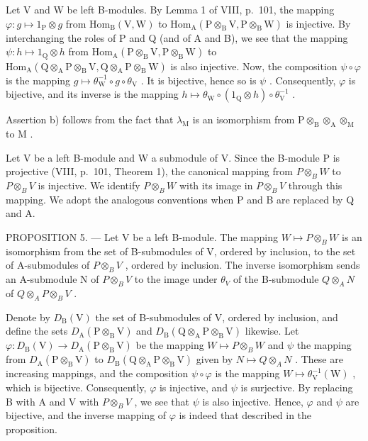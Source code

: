 Let V and W be left B-modules. By Lemma 1 of VIII, p.~101, the mapping \(\varphi : g \mapsto 1_{\mathrm{P}} \otimes g\) from \(\mathrm{Hom}_{\mathrm{B}}(\mathrm{V}, \mathrm{W})\) to \(\mathrm{Hom}_{\mathrm{A}}(\mathrm{P} \otimes_{\mathrm{B}} \mathrm{V}, \mathrm{P} \otimes_{\mathrm{B}} \mathrm{W})\) is injective. By interchanging the roles of P and Q (and of A and B), we see that the mapping \(\psi : h \mapsto 1_{\mathrm{Q}} \otimes h\) from \(\mathrm{Hom}_{\mathrm{A}}(\mathrm{P} \otimes_{\mathrm{B}} \mathrm{V}, \mathrm{P} \otimes_{\mathrm{B}} \mathrm{W})\) to \(\mathrm{Hom}_{\mathrm{A}}(\mathrm{Q} \otimes_{\mathrm{A}} \mathrm{P} \otimes_{\mathrm{B}} \mathrm{V}, \mathrm{Q} \otimes_{\mathrm{A}} \mathrm{P} \otimes_{\mathrm{B}} \mathrm{W})\) is also injective. Now, the composition \(\psi \circ \varphi\) is the mapping \(g \mapsto \theta_{\mathrm{W}}^{-1} \circ g \circ \theta_{\mathrm{V}}\) . It is bijective, hence so is \(\psi\) . Consequently, \(\varphi\) is bijective, and its inverse is the mapping \(h \mapsto \theta_{\mathrm{W}} \circ (1_{\mathrm{Q}} \otimes h) \circ \theta_{\mathrm{V}}^{-1}\) .

Assertion b) follows from the fact that \(\lambda_{\mathrm{M}}\) is an isomorphism from \(\mathrm{P} \otimes_{\mathrm{B}} \otimes_{\mathrm{A}} \otimes_{\mathrm{M}}\) to \(\mathrm{M}\) .

Let V be a left B-module and W a submodule of V. Since the B-module P is projective (VIII, p.~101, Theorem 1), the canonical mapping from \(P \otimes_{B} W\) to \(P \otimes_{B} V\) is injective. We identify \(P \otimes_{B} W\) with its image in \(P \otimes_{B} V\) through this mapping. We adopt the analogous conventions when P and B are replaced by Q and A.

PROPOSITION 5. --- Let V be a left B-module. The mapping \(W \mapsto P \otimes_{B} W\) is an isomorphism from the set of B-submodules of V, ordered by inclusion, to the set of A-submodules of \(P \otimes_{B} V\) , ordered by inclusion. The inverse isomorphism sends an A-submodule N of \(P \otimes_{B} V\) to the image under \(\theta_{V}\) of the B-submodule \(Q \otimes_{A} N\) of \(Q \otimes_{A} P \otimes_{B} V\) .

Denote by \(D_{\mathrm{B}}(\mathrm{V})\) the set of B-submodules of V, ordered by inclusion, and define the sets \(D_{\mathrm{A}}(\mathrm{P}\otimes_{\mathrm{B}}\mathrm{V})\) and \(D_{\mathrm{B}}(\mathrm{Q}\otimes_{\mathrm{A}}\mathrm{P}\otimes_{\mathrm{B}}\mathrm{V})\) likewise. Let \(\varphi:D_{\mathrm{B}}(\mathrm{V})\to D_{\mathrm{A}}(\mathrm{P}\otimes_{\mathrm{B}}\mathrm{V})\) be the mapping \(W\mapsto P\otimes_{B}W\) and \(\psi\) the mapping from \(D_{\mathrm{A}}(\mathrm{P}\otimes_{\mathrm{B}}\mathrm{V})\) to \(D_{\mathrm{B}}(\mathrm{Q}\otimes_{\mathrm{A}}\mathrm{P}\otimes_{\mathrm{B}}\mathrm{V})\) given by \(N\mapsto Q\otimes_{A}N\) . These are increasing mappings, and the composition \(\psi\circ\varphi\) is the mapping \(W\mapsto\theta_{\mathrm{V}}^{-1}(\mathrm{W})\) , which is bijective. Consequently, \(\varphi\) is injective, and \(\psi\) is surjective. By replacing B with A and V with \(P\otimes_{B}V\) , we see that \(\psi\) is also injective. Hence, \(\varphi\) and \(\psi\) are bijective, and the inverse mapping of \(\varphi\) is indeed that described in the proposition.

